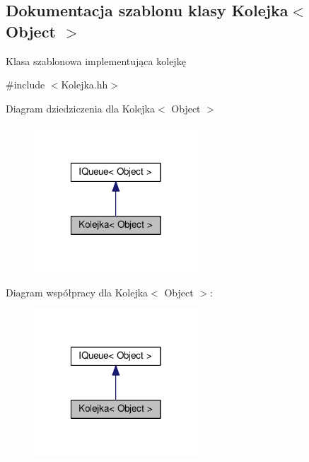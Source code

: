 \hypertarget{class_kolejka}{\subsection{Dokumentacja szablonu klasy Kolejka$<$ Object $>$}
\label{class_kolejka}
}


Klasa szablonowa implementująca kolejkę  




{\ttfamily \#include $<$Kolejka.\-hh$>$}



Diagram dziedziczenia dla Kolejka$<$ Object $>$
\nopagebreak
\begin{figure}[H]
\begin{center}
\leavevmode
\includegraphics[width=174pt]{class_kolejka__inherit__graph}
\end{center}
\end{figure}


Diagram współpracy dla Kolejka$<$ Object $>$\-:
\nopagebreak
\begin{figure}[H]
\begin{center}
\leavevmode
\includegraphics[width=174pt]{class_kolejka__coll__graph}
\end{center}
\end{figure}
